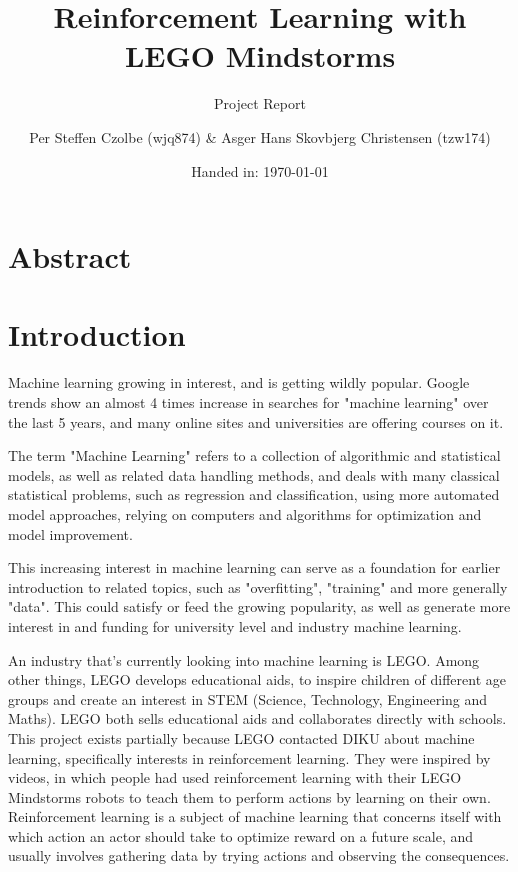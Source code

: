 \documentclass[11pt, a4paper]{article}
\author{Per Steffen Czolbe (wjq874) \& Asger Hans Skovbjerg Christensen (tzw174)}
\title{Reinforcement Learning with LEGO Mindstorms}
\subtitle{Project Report}
\date{Handed in: \today}
\begin{document}
\maketitle

\section{Abstract}

\tableofcontents


\section{Introduction}
Machine learning growing in interest, and is getting wildly popular. Google trends show an almost 4 times increase in searches for "machine learning" over the last 5 years\cite{googletrendsML}, and many online sites and universities are offering courses on it.

The term "Machine Learning" refers to a collection of algorithmic and statistical models, as well as related data handling methods, and deals with many classical statistical problems, such as regression and classification, using more automated model approaches, relying on computers and algorithms for optimization and model improvement.

This increasing interest in machine learning can serve as a foundation for earlier introduction to related topics, such as "overfitting", "training" and more generally "data". This could satisfy or feed the growing popularity, as well as generate more interest in and funding for university level and industry machine learning. 

An industry that's currently looking into machine learning is LEGO. Among other things, LEGO develops educational aids, to inspire children of different age groups and create an interest in STEM (Science, Technology, Engineering and Maths)\cite{LEGOeducation}. LEGO both sells educational aids and collaborates directly with schools\cite{naerheden}. This project exists partially because LEGO contacted DIKU about machine learning, specifically interests in reinforcement learning. They were inspired by videos, in which people had used reinforcement learning with their LEGO Mindstorms robots to teach them to perform actions by learning on their own\cite{youtube_crawl}\cite{youtube_swing}. Reinforcement learning is a subject of machine learning that concerns itself with which action an actor should take to optimize reward on a future scale, and usually involves gathering data by trying actions and observing the consequences. 
\end{document}
